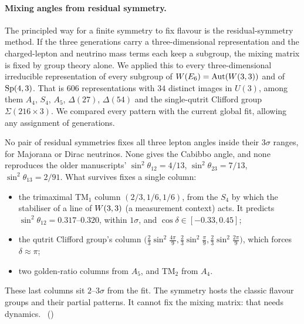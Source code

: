 \paragraph{Mixing angles from residual symmetry.}
The principled way for a finite symmetry to fix flavour is the residual-symmetry method. If the three generations
carry a three-dimensional representation and the charged-lepton and neutrino mass terms each keep a subgroup, the mixing
matrix is fixed by group theory alone. We applied this to every three-dimensional irreducible representation of every
subgroup of $W(E_6)=\mathrm{Aut}(W(3,3))$ and of $\mathrm{Sp}(4,3)$. That is $606$ representations with $34$ distinct images in
$U(3)$, among them $A_4$, $S_4$, $A_5$, $\Delta(27)$, $\Delta(54)$ and the single-qutrit Clifford group
$\Sigma(216\times3)$. We compared every pattern with the current global fit, allowing any assignment of generations.

No pair of residual symmetries fixes all three lepton angles inside their $3\sigma$ ranges, for Majorana or Dirac
neutrinos. None gives the Cabibbo angle, and none reproduces the older manuscripts' $\sin^2\theta_{12}=4/13$,
$\sin^2\theta_{23}=7/13$, $\sin^2\theta_{13}=2/91$. What survives fixes a single column:
\begin{itemize}
\item the trimaximal TM$_1$ column $(2/3,1/6,1/6)$, from the $S_4$ by which the stabiliser of a line of $W(3,3)$ (a
  measurement context) acts. It predicts $\sin^2\theta_{12}=0.317$--$0.320$, within $1\sigma$, and
  $\cos\delta\in[-0.33,0.45]$;
\item the qutrit Clifford group's column $\bigl(\tfrac23\sin^2\tfrac{4\pi}9,\tfrac23\sin^2\tfrac{\pi}9,
  \tfrac23\sin^2\tfrac{2\pi}9\bigr)$, which forces $\delta\approx\pi$;
\item two golden-ratio columns from $A_5$, and TM$_2$ from $A_4$.
\end{itemize}
These last columns sit $2$--$3\sigma$ from the fit. The symmetry hosts the classic flavour groups and their partial
patterns. It cannot fix the mixing matrix: that needs dynamics. \tierC\ ()

